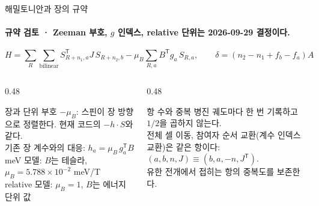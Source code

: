 \begin{frame}[label=hamiltonian-convention]{해밀토니안과 장의 규약}
  \framesubtitle{규약 검토 · Zeeman 부호, $g$ 인덱스, relative 단위는 2026-09-29 결정이다.}
  \[
    H=\sum_{R}\sum_{\mathrm{bilinear}} S_{R+n_1,a}^{\mathsf T}J\,S_{R+n_2,b}
      -\mu_B\sum_{R,a}B^{\mathsf T}g_a\,S_{R,a},
    \qquad \delta=(n_2-n_1+f_b-f_a)A
  \]
  \begin{columns}[T,onlytextwidth]
    \begin{column}{0.48\textwidth}
      \begin{block}{장과 단위}
        부호 $-\mu_B$: 스핀이 장 방향으로 정렬한다. 현재 코드의 $-h\cdot S$와 같다.\\[0.4em]
        기존 장 계수와의 대응: $h_a=\mu_B\,g_a^{\mathsf T}B$\\[0.4em]
        meV 모델: $B$는 테슬라, $\mu_B=5.788\times10^{-2}$ meV/T\\[0.4em]
        relative 모델: $\mu_B=1$, $B$는 에너지 단위 값
      \end{block}
    \end{column}
    \begin{column}{0.48\textwidth}
      \begin{block}{항 수와 중복}
        병진 궤도마다 한 번 기록하고 $1/2$을 곱하지 않는다.\\[0.4em]
        전체 셀 이동, 참여자 순서 교환(계수 인덱스 교환)은 같은 항이다:
        $(a,b,n,J)\equiv(b,a,-n,J^{\mathsf T})$.\\[0.4em]
        유한 전개에서 접히는 항의 중복도를 보존한다.
      \end{block}
    \end{column}
  \end{columns}
\end{frame}

